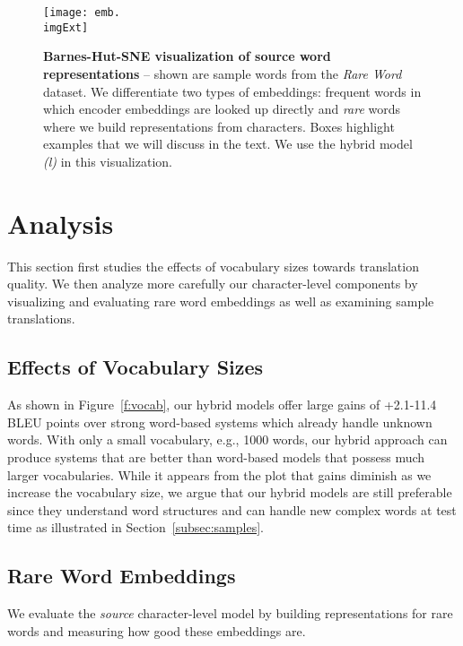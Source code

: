 \documentclass[11pt]{article}
\newcommand{\imgExt}{eps}
\newcommand{\model}{{\it (l)}}
\newcommand{\gain}{2.1{-}11.4}
\begin{document}
\begin{figure*}%
\centering
\texttt{[image: emb.\\imgExt]}
\caption{{\bf Barnes-Hut-SNE visualization of source word representations} --
shown are sample words from the {\it Rare Word} dataset. We differentiate two types of
embeddings: {\color{blue} frequent} words in which encoder embeddings are looked up directly and {\it {\color{magenta} rare}} words
where we build representations from characters. Boxes highlight examples that
we will discuss in the text. We use the hybrid model \model{} in this visualization.}
\label{f:visual}
\end{figure*}


\section{Analysis}
\label{sec:analysis}
This section first studies the effects of vocabulary sizes towards
translation quality. We then analyze more carefully 
our character-level components by visualizing and evaluating rare word
embeddings as well as examining sample translations.

\subsection{Effects of Vocabulary Sizes}
As shown in Figure~\ref{f:vocab}, our hybrid models offer large gains of
+\gain{} BLEU points over strong word-based systems which already handle unknown words.
With only a small vocabulary, e.g., 1000 words, our hybrid approach can produce
systems that are better than word-based models that possess much larger
vocabularies. While it appears from the plot that gains diminish as we
increase the vocabulary size, we argue that our hybrid models are still
preferable since they understand word structures and can handle new complex
words at test time as illustrated in Section~\ref{subsec:samples}.


\subsection{Rare Word Embeddings}
We evaluate the {\it source} character-level model by building representations
for rare words and measuring how good these embeddings are.
\end{document}

